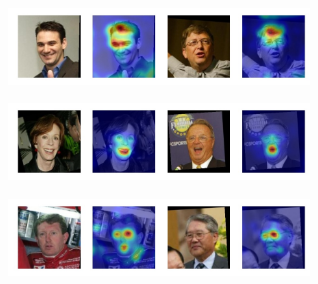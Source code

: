 \begin{figure}
\captionsetup[subfigure]{labelformat=empty}
    \centering
    \begin{subfigure}
        \centering
        \includegraphics[width=8cm, trim={0 1cm 0 0},clip]{saliency-new/saliency-smooth/bald-1.jpeg}
        \footnotesize
        \vspace{0.4cm}
    \end{subfigure}
    
    \begin{subfigure}
        \centering
        \includegraphics[width=8cm, trim={0 1cm 0 0},clip]{saliency-new/saliency-smooth/smile-1.jpeg}
        \footnotesize
        \vspace{0.4cm}
    \end{subfigure}
    
    \begin{subfigure}
        \centering
        \includegraphics[width=8cm, trim={0 1cm 0 0},clip]{saliency-new/saliency-smooth/eyesopen-1.jpeg}
        \footnotesize
        \vspace{0.4cm}
    \end{subfigure}
    

\end{figure}
